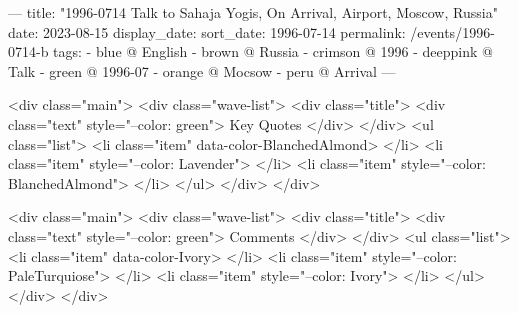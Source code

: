 ---
title: "1996-0714 Talk to Sahaja Yogis, On Arrival, Airport, Moscow, Russia"
date: 2023-08-15
display_date: 
sort_date: 1996-07-14
permalink: /events/1996-0714-b
tags:
  - blue @ English
  - brown @ Russia
  - crimson @ 1996
  - deeppink @ Talk
  - green @ 1996-07
  - orange @ Mocsow
  - peru @ Arrival
---

<div class="main">
  <div class="wave-list">
    <div class="title">
      <div class="text" style="--color: green">
        Key Quotes
      </div>
    </div>
    <ul class="list">
        <li class="item" data-color-BlanchedAlmond>
        </li>
        <li class="item" style="--color: Lavender">
        </li>
        <li class="item" style="--color: BlanchedAlmond">
        </li>
      </ul>
  </div>
</div>

<div class="main">
  <div class="wave-list">
    <div class="title">
      <div class="text" style="--color: green">
        Comments
      </div>
    </div>
    <ul class="list">
        <li class="item" data-color-Ivory>
        </li>
        <li class="item" style="--color: PaleTurquiose">
        </li>
        <li class="item" style="--color: Ivory">
        </li>
      </ul>
  </div>
</div>